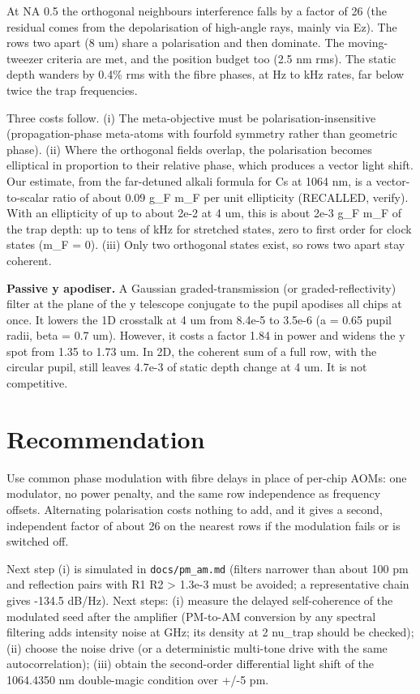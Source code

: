 At NA 0.5 the orthogonal neighbours\textquotesingle{} interference falls
by a factor of 26 (the residual comes from the depolarisation of
high-angle rays, mainly via Ez). The rows two apart (8 um) share a
polarisation and then dominate. The moving-tweezer criteria are met, and
the position budget too (2.5 nm rms). The static depth wanders by 0.4\%
rms with the fibre phases, at Hz to kHz rates, far below twice the trap
frequencies.

Three costs follow. (i) The meta-objective must be
polarisation-insensitive (propagation-phase meta-atoms with fourfold
symmetry rather than geometric phase). (ii) Where the orthogonal fields
overlap, the polarisation becomes elliptical in proportion to their
relative phase, which produces a vector light shift. Our estimate, from
the far-detuned alkali formula for Cs at 1064 nm, is a vector-to-scalar
ratio of about 0.09 g\_F m\_F per unit ellipticity (RECALLED, verify).
With an ellipticity of up to about 2e-2 at 4 um, this is about 2e-3 g\_F
m\_F of the trap depth: up to tens of kHz for stretched states, zero to
first order for clock states (m\_F = 0). (iii) Only two orthogonal
states exist, so rows two apart stay coherent.

\textbf{Passive y apodiser.} A Gaussian graded-transmission (or
graded-reflectivity) filter at the plane of the y telescope conjugate to
the pupil apodises all chips at once. It lowers the 1D crosstalk at 4 um
from 8.4e-5 to 3.5e-6 (a = 0.65 pupil radii, beta = 0.7 um). However, it
costs a factor 1.84 in power and widens the y spot from 1.35 to 1.73 um.
In 2D, the coherent sum of a full row, with the circular pupil, still
leaves 4.7e-3 of static depth change at 4 um. It is not competitive.

\hypertarget{5-recommendation}{%
\section{Recommendation}\label{row_coherence-5-recommendation}}

Use common phase modulation with fibre delays in place of per-chip AOMs:
one modulator, no power penalty, and the same row independence as
frequency offsets. Alternating polarisation costs nothing to add, and it
gives a second, independent factor of about 26 on the nearest rows if
the modulation fails or is switched off.

Next step (i) is simulated in \texttt{docs/pm\_am.md} (filters narrower
than about 100 pm and reflection pairs with R1 R2 \textgreater{} 1.3e-3
must be avoided; a representative chain gives -134.5 dB/Hz). Next steps:
(i) measure the delayed self-coherence of the modulated seed after the
amplifier (PM-to-AM conversion by any spectral filtering adds intensity
noise at GHz; its density at 2 nu\_trap should be checked); (ii) choose
the noise drive (or a deterministic multi-tone drive with the same
autocorrelation); (iii) obtain the second-order differential light shift
of the 1064.4350 nm double-magic condition over +/-5 pm.

